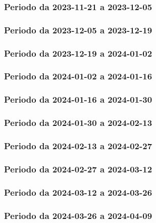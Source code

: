 \documentclass[10pt, a4paper]{article}
\begin{document}
{{{{{{{\subsubsection{Periodo da 2023-11-21 a 2023-12-05}

\subsubsection{Periodo da 2023-12-05 a 2023-12-19}


\subsubsection{Periodo da 2023-12-19 a 2024-01-02}



\subsubsection{Periodo da 2024-01-02 a 2024-01-16}



\subsubsection{Periodo da 2024-01-16 a 2024-01-30}



\subsubsection{Periodo da 2024-01-30 a 2024-02-13}



\subsubsection{Periodo da 2024-02-13 a 2024-02-27}



\subsubsection{Periodo da 2024-02-27 a 2024-03-12}


\subsubsection{Periodo da 2024-03-12 a 2024-03-26}



\subsubsection{Periodo da 2024-03-26 a 2024-04-09}


}}}}}}}
\end{document}
